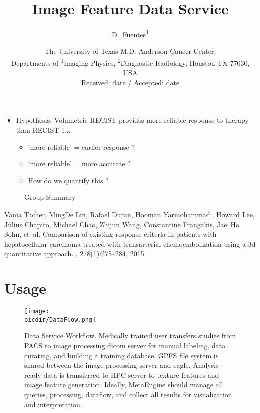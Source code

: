 \documentclass[10pt]{amsart}
\title{Image Feature Data Service}
\author{
        D.~Fuentes\textsuperscript{1} 
}
\date{ \small
The University of Texas M.D. Anderson Cancer Center,\\
Departments of \textsuperscript{1}Imaging Physics, \textsuperscript{2}Diagnostic Radiology,
Houston TX 77030, USA \\
Received: date / Accepted: date
}
\newcommand{\picdir}{./pdffig}
\begin{document}
\maketitle

\begin{itemize}
  \item Hypothesis: Volumetric RECIST\cite{tacher2015comparison} provides
more reliable response to therapy than RECIST 1.x \begin{itemize}
      \item 'more reliable' = earlier response ?
      \item 'more reliable' = more accurate ?  
      \item How do we quantify this ?
    \end{itemize}
\end{itemize}

\begin{figure}[h]
   \caption{Group Summary}\label{fig:GroupSummary}
\end{figure}
        
\begin{thebibliography}{1}

Vania Tacher, MingDe Lin, Rafael Duran, Hooman Yarmohammadi, Howard Lee,
Julius
  Chapiro, Michael Chao, Zhijun Wang, Constantine Frangakis, Jae~Ho Sohn,
  et~al.
\newblock Comparison of existing response criteria in patients with
  hepatocellular carcinoma treated with transarterial chemoembolization
using a
  3d quantitative approach.
, 278(1):275--284, 2015.

\end{thebibliography}

\pagebreak
\section{Usage}
\begin{figure}[h]
\texttt{[image: \\picdir/DataFlow.png]}
\caption{
Data Service Workflow.
Medically trained user transfers studies from PACS to image 
processing dicom server for manual labeling, data curating, and building a training database.
GPFS file system is shared between the image processing server and eagle.
Analysis-ready data is transferred to HPC server to texture features and image feature generation.
Ideally, MetaEngine should manage all queries, processing, dataflow, 
and collect all results for visualization and interpretation.
}\label{Fig:DataFlow}
\end{figure}
\end{document}
